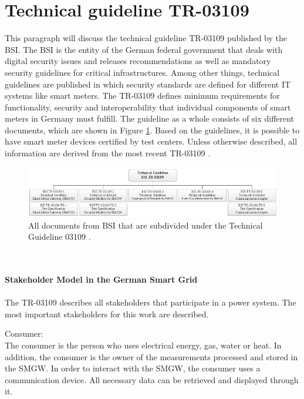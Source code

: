\section{Technical guideline TR-03109}
\label{sec:TR_03109}
This paragraph will discuss the technical guideline \gls{TR-03109} published by the \gls{BSI}. The \gls{BSI} is the entity of the German federal government that deals with digital security issues and releases recommendations as well as mandatory security guidelines for critical infrastructures. Among other things, technical guidelines are published in which security standards are defined for different IT systems like smart meters. The \gls{TR-03109} defines minimum requirements for functionality, security and interoperability that individual components of smart meters in Germany must fulfill. The guideline as a whole consists of six different documents, which are shown in Figure \ref{fig:TG03109}. Based on the guidelines, it is possible to have smart meter devices certified by test centers. Unless otherwise described, all information are derived from the most recent \gls{TR-03109} \cite{TR-031}.\begin{figure}[tbp]
  \centering
  \includegraphics[width=1\textwidth]{images/BSI-TR-03109.png}
  \caption[Technical Guideline 03109 Overview]{All documents from \gls{BSI} that are subdivided under the Technical Guideline 03109 \cite{Anna}.}
  \label{fig:TG03109}
\end{figure}
\\%
\\
\textbf{Stakeholder Model in the German Smart Grid}
\label{subsec:stakeholder_model}
\\
\\
The \gls{TR-03109} describes all stakeholders that participate in a power system. The most important stakeholders for this work are described.
\\\item Consumer: \\
The consumer is the person who uses electrical energy, gas, water
or heat. In addition, the consumer is the owner of the measurements processed and stored in the \gls{SMGW}. In order to interact with the \gls{SMGW}, the consumer uses a communication device. All necessary data can be retrieved and displayed through it.\\
